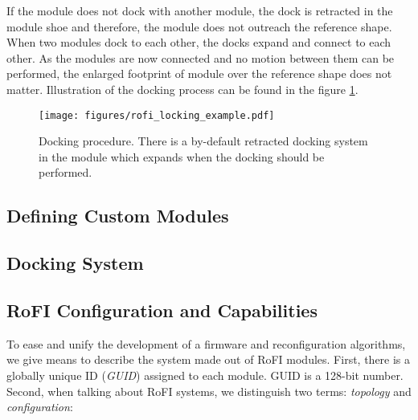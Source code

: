 If the module does not dock with another module, the dock is retracted in the
module shoe and therefore, the module does not outreach the reference shape.
When two modules dock to each other, the docks expand and connect to each other.
As the modules are now connected and no motion between them can be performed,
the enlarged footprint of module over the reference shape does not matter.
Illustration of the docking process can be found in the figure
\ref{fig:rofi_locking_example}.

\begin{figure}
    \centering
    \texttt{[image: figures/rofi\_locking\_example.pdf]}
    \caption{Docking procedure. There is a by-default retracted docking system
    in the module which expands when the docking should be performed.}
    \label{fig:rofi_locking_example}
\end{figure}

\subsection{Defining Custom Modules}\label{subsec:custom_modules}

\subsection{Docking System}\label{subsec:lock}

\subsection{RoFI Configuration and Capabilities} \label{sec:configuration}

To ease and unify the development of a firmware and reconfiguration algorithms,
we give means to describe the system made out of RoFI modules. First, there is
a globally unique ID (\emph{GUID}) assigned to each module. GUID is a 128-bit
number. Second, when talking about RoFI systems, we distinguish two terms:
\emph{topology} and \emph{configuration}: 


